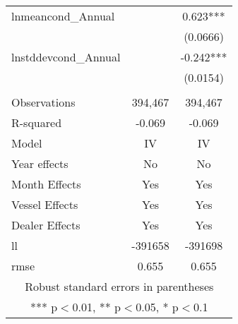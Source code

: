 \begin{tabular}{lcc}
lnmeancond\_Annual &  & 0.623*** \\
 &  & (0.0666) \\
lnstddevcond\_Annual &  & -0.242*** \\
 &  & (0.0154) \\
 &  &  \\
Observations & 394,467 & 394,467 \\
R-squared & -0.069 & -0.069 \\
Model & IV & IV \\
Year effects & No & No \\
Month Effects & Yes & Yes \\
Vessel Effects & Yes & Yes \\
Dealer Effects & Yes & Yes \\
ll & -391658 & -391698 \\
 rmse & 0.655 & 0.655 \\ \hline
\multicolumn{3}{c}{ Robust standard errors in parentheses} \\
\multicolumn{3}{c}{ *** p$<$0.01, ** p$<$0.05, * p$<$0.1} \\
\end{tabular}
